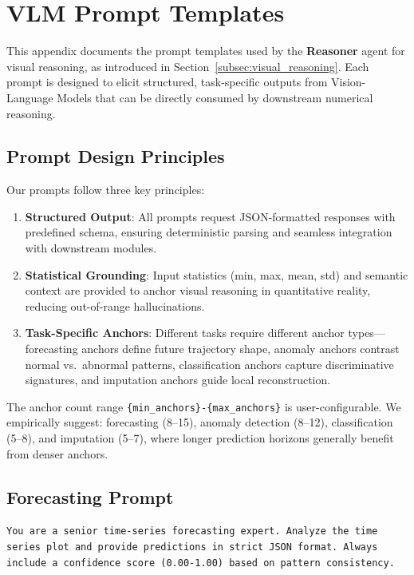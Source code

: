 \section{VLM Prompt Templates}
\label{appx:prompt}

This appendix documents the prompt templates used by the \textbf{Reasoner} agent for visual reasoning, as introduced in Section~\ref{subsec:visual_reasoning}. Each prompt is designed to elicit structured, task-specific outputs from Vision-Language Models that can be directly consumed by downstream numerical reasoning.

\subsection{Prompt Design Principles}
\label{appx:prompt_philosophy}

Our prompts follow three key principles:
\begin{enumerate}[leftmargin=*, itemsep=2pt]
    \item \textbf{Structured Output}: All prompts request JSON-formatted responses with predefined schema, ensuring deterministic parsing and seamless integration with downstream modules.
    \item \textbf{Statistical Grounding}: Input statistics (min, max, mean, std) and semantic context are provided to anchor visual reasoning in quantitative reality, reducing out-of-range hallucinations.
    \item \textbf{Task-Specific Anchors}: Different tasks require different anchor types---forecasting anchors define future trajectory shape, anomaly anchors contrast normal vs.\ abnormal patterns, classification anchors capture discriminative signatures, and imputation anchors guide local reconstruction.
\end{enumerate}

The anchor count range \texttt{\{min\_anchors\}-\{max\_anchors\}} is user-configurable. We empirically suggest: forecasting (8--15), anomaly detection (8--12), classification (5--8), and imputation (5--7), where longer prediction horizons generally benefit from denser anchors.

\subsection{Forecasting Prompt}
\label{appx:prompt_forecast}

\begin{tcolorbox}[colback=gray!5, colframe=gray!50, title=System Prompt (Forecasting)]
\small
\texttt{You are a senior time-series forecasting expert. Analyze the time series plot and provide predictions in strict JSON format. Always include a confidence score (0.00-1.00) based on pattern consistency.}
\end{tcolorbox}

